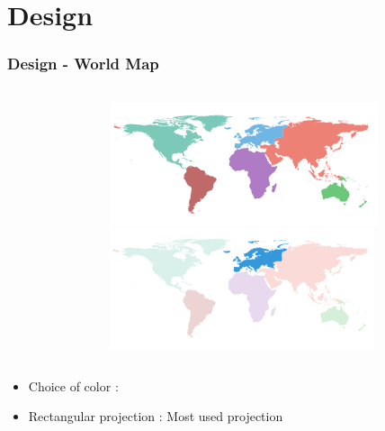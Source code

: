 \documentclass{beamer}
\begin{document}
\section{Design}

\begin{frame}
\frametitle{Design - World Map}

\begin{columns}[T]
  \begin{column}{.7\textwidth}
    \begin{table}
    \end{table}
  \end{column}
  \begin{column}{.25\textwidth}
    \begin{figure}
      \centering
      \includegraphics[scale=0.3]{img/map.png} \\
      \includegraphics[scale=0.3]{img/map_selected.png}
    \end{figure}
  \end{column}
\end{columns}
\begin{itemize}
\item Choice of color : 
\item Rectangular projection : Most used projection  
\end{itemize}
\end{frame}
\end{document}
